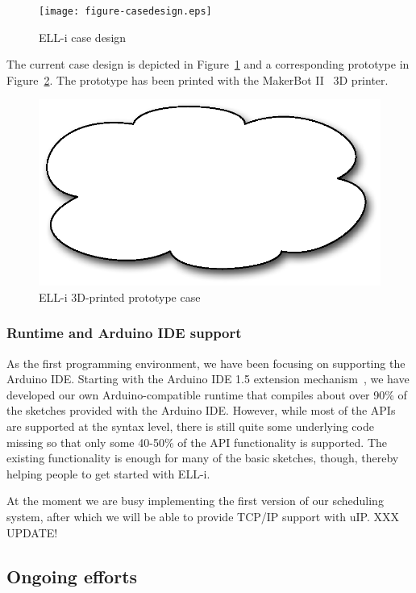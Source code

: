 \documentclass[final]{siamltex}
\begin{document}
\begin{figure}
\centering
\texttt{[image: figure-casedesign.eps]}
\caption{ELL-i case design}
\label{fig:casedesign}
\end{figure}

The current case design is depicted in Figure~\ref{fig:casedesign} and
a corresponding prototype in Figure~\ref{fig:case}.  The prototype has
been printed with the MakerBot II~\cite{MakerBotII} 3D printer.

\begin{figure}
\centering
\includegraphics[scale=.4]{figure-case.eps}
\caption{ELL-i 3D-printed prototype case}
\label{fig:case}
\end{figure}


\subsubsection{Runtime and Arduino IDE support}

As the first programming environment, we have been focusing on
supporting the Arduino IDE.  Starting with the Arduino IDE 1.5
extension mechanism~\cite{ArduinoIDEextension}, we have developed our
own Arduino-compatible runtime that compiles about over 90\% of the
sketches provided with the Arduino IDE.  However, while most of the
APIs are supported at the syntax level, there is still quite some
underlying code missing so that only some 40-50\% of the API
functionality is supported.  The existing functionality is enough for
many of the basic sketches, though, thereby helping people to get
started with ELL-i.

At the moment we are busy implementing the first version of our
scheduling system, after which we will be able to provide TCP/IP
support with uIP.  XXX UPDATE!

\subsection{Ongoing efforts}
\end{document}
